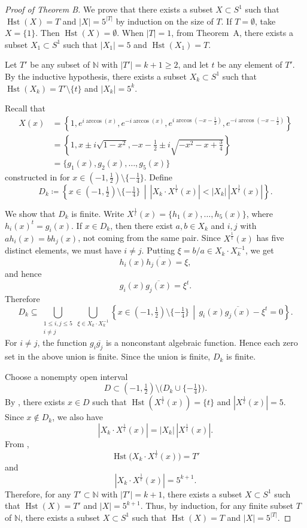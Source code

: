 \documentclass{amsart}
\theoremstyle{definition}
\DeclareMathOperator{\Hst}{Hst}
\newcommand{\NN}{\mathbb{N}}
\begin{document}
\begin{proof}[Proof of Theorem B]
We prove that there exists a subset \(X\subset S^1\) such that
\(\Hst(X)=T\) and \(|X|=5^{|T|}\) by induction on the size of \(T\).
If \(T=\emptyset\), take \(X=\{1\}\). Then \(\Hst(X)=\emptyset\).
When \(|T|=1\), from Theorem~A, there exists a subset \(X_1\subset S^1\)
such that \(|X_1|=5\) and \(\Hst(X_1)=T\).

Let \(T'\) be any subset of \(\NN\) with \(|T'|=k+1\geq2\), and let
\(t\) be any element of \(T'\). By the inductive hypothesis, there exists
a subset \(X_k\subset S^1\) such that \(\Hst(X_k)=T'\setminus\{t\}\) and
\(|X_k|=5^k\).

Recall that
\begin{align*}
X(x)
&=\left\{
1,e^{i\arccos(x)},e^{-i\arccos(x)},
e^{i\arccos(-x-\tfrac12)},e^{-i\arccos(-x-\tfrac12)}
\right\} \\
&=\left\{
1,x\pm i\sqrt{1-x^2},
-x-\tfrac12\pm i\sqrt{-x^2-x+\tfrac34}
\right\} \\
&=\{g_1(x),g_2(x),\ldots,g_5(x)\}
\end{align*}
constructed in  for
\(x\in(-1,\tfrac12)\setminus\{-\tfrac14\}\). Define
\[
D_k\coloneqq
\left\{
x\in(-1,\tfrac12)\setminus\{-\tfrac14\}
\,\middle|\,
|X_k\cdot X^{\tfrac1t}(x)|
<
|X_k|\,|X^{\tfrac1t}(x)|
\right\}.
\]

We show that \(D_k\) is finite. Write
\(X^{\tfrac1t}(x)=\{h_1(x),\ldots,h_5(x)\}\), where \(h_i(x)^t=g_i(x)\).
If \(x\in D_k\), then there exist \(a,b\in X_k\) and \(i,j\) with
\(a h_i(x)=b h_j(x)\), not coming from the same pair. Since
\(X^{\tfrac1t}(x)\) has five distinct elements, we must have \(i\neq j\).
Putting \(\xi=b/a\in X_k\cdot X_k^{-1}\), we get
\[
h_i(x)\overline{h_j(x)}=\xi,
\]
and hence
\[
g_i(x)\overline{g_j(x)}=\xi^t.
\]
Therefore
\[
D_k\subseteq
\bigcup_{\substack{1\leq i,j\leq5\\ i\neq j}}
\bigcup_{\xi\in X_k\cdot X_k^{-1}}
\left\{
x\in(-1,\tfrac12)\setminus\{-\tfrac14\}
\,\middle|\,
g_i(x)\overline{g_j(x)}-\xi^t=0
\right\}.
\]
For \(i\neq j\), the function \(g_i\overline{g_j}\) is a nonconstant algebraic function. Hence each zero set in the above union is finite.
Since the union is finite, \(D_k\) is finite.

Choose a nonempty open interval
\[
D\subset (-1,\tfrac12)\setminus\bigl(D_k\cup\{-\tfrac14\}\bigr).
\]
By , there exists \(x\in D\) such that
\(\Hst(X^{\tfrac1t}(x))=\{t\}\) and \(|X^{\tfrac1t}(x)|=5\).
Since \(x\notin D_k\), we also have
\[
|X_k\cdot X^{\tfrac1t}(x)|
=
|X_k|\,|X^{\tfrac1t}(x)|.
\]
From ,
\[
\Hst\bigl(X_k\cdot X^{\tfrac1t}(x)\bigr)=T'
\]
and
\[
|X_k\cdot X^{\tfrac1t}(x)|=5^{k+1}.
\]
Therefore, for any \(T'\subset\NN\) with \(|T'|=k+1\), there exists a
subset \(X\subset S^1\) such that \(\Hst(X)=T'\) and \(|X|=5^{k+1}\).
Thus, by induction, for any finite subset \(T\) of \(\NN\), there exists
a subset \(X\subset S^1\) such that \(\Hst(X)=T\) and \(|X|=5^{|T|}\).
\end{proof}
\end{document}
